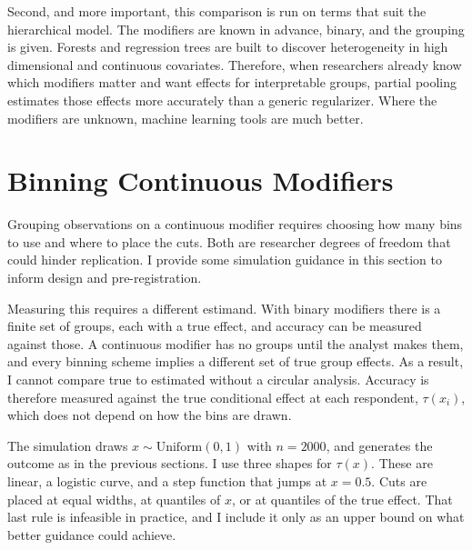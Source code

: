\documentclass[12pt]{article}
\begin{document}
Second, and more important, this comparison is run on terms that suit the hierarchical model.
The modifiers are known in advance, binary, and the grouping is given.
Forests and regression trees are built to discover heterogeneity in high dimensional and continuous covariates. 
Therefore, when researchers already know which modifiers matter and want effects for interpretable groups, partial pooling estimates those effects more accurately than a generic regularizer.
Where the modifiers are unknown, machine learning tools are much better.

%



\newpage

\section{Binning Continuous Modifiers}

Grouping observations on a continuous modifier requires choosing how many bins to use and where to place the cuts.
Both are researcher degrees of freedom that could hinder replication.
I provide some simulation guidance in this section to inform design and pre-registration.


Measuring this requires a different estimand.
With binary modifiers there is a finite set of groups, each with a true effect, and accuracy can be measured against those.
A continuous modifier has no groups until the analyst makes them, and every binning scheme implies a different set of true group effects. 
As a result, I cannot compare true to estimated without a circular analysis.
Accuracy is therefore measured against the true conditional effect at each respondent, $\tau(x_i)$, which does not depend on how the bins are drawn.

The simulation draws $x \sim \text{Uniform}(0,1)$ with $n = 2000$, and generates the outcome as in the previous sections.
I use three shapes for $\tau(x)$.
These are linear, a logistic curve, and a step function that jumps at $x = 0.5$.
Cuts are placed at equal widths, at quantiles of $x$, or at quantiles of the true effect.
That last rule is infeasible in practice, and I include it only as an upper bound on what better guidance could achieve.
\end{document}
